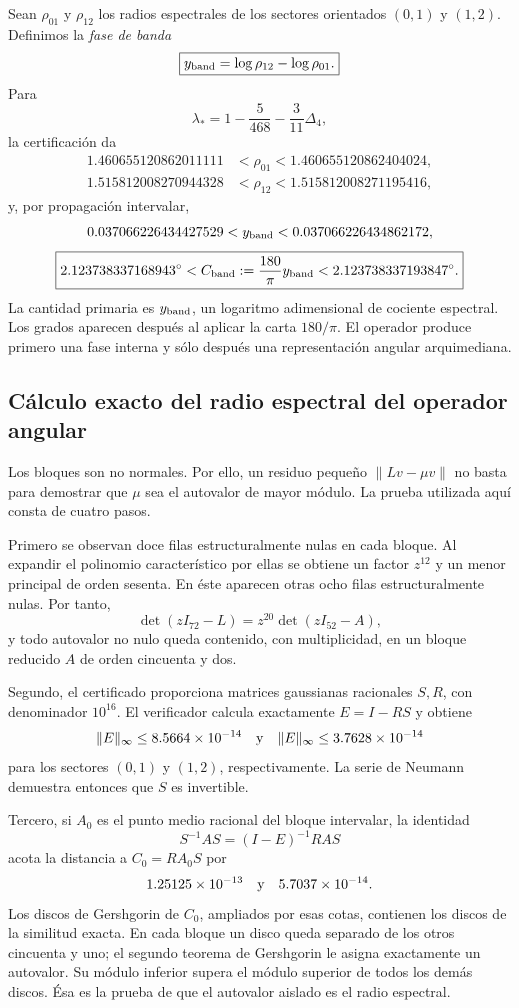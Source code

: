 Sean \(\rho_{01}\) y \(\rho_{12}\) los radios espectrales de los sectores
orientados \((0,1)\) y \((1,2)\). Definimos la \emph{fase de banda}
\[
 \boxed{y_{\rm band}=\log\rho_{12}-\log\rho_{01}.}
\]
Para
\[
 \lambda_*
 =1-\frac5{468}-\frac3{11}\Delta_4,
\]
la certificación da
\[
\begin{aligned}
1.460655120862011111
&<\rho_{01}<1.460655120862404024,\\
1.515812008270944328
&<\rho_{12}<1.515812008271195416,
\end{aligned}
\]
y, por propagación intervalar,
\[
 0.037066226434427529
 <y_{\rm band}<
 0.037066226434862172,
\]
\[
 \boxed{
 2.123738337168943^\circ
 <C_{\rm band}:=\frac{180}{\pi}y_{\rm band}
 <2.123738337193847^\circ.}
\]
La cantidad primaria es \(y_{\rm band}\), un logaritmo adimensional de cociente
espectral. Los grados aparecen después al aplicar la carta
\(180/\pi\). El operador produce primero una fase interna y sólo después
una representación angular arquimediana.

\subsection{Cálculo exacto del radio espectral del operador angular}

Los bloques son no normales. Por ello, un residuo pequeño
\(\|Lv-\mu v\|\) no basta para demostrar que \(\mu\) sea el autovalor de
mayor módulo. La prueba utilizada aquí consta de cuatro pasos.

Primero se observan doce filas estructuralmente nulas en cada bloque. Al
expandir el polinomio característico por ellas se obtiene un factor
\(z^{12}\) y un menor principal de orden sesenta. En éste aparecen otras
ocho filas estructuralmente nulas. Por tanto,
\[
 \det(zI_{72}-L)=z^{20}\det(zI_{52}-A),
\]
y todo autovalor no nulo queda contenido, con multiplicidad, en un bloque
reducido \(A\) de orden cincuenta y dos.

Segundo, el certificado proporciona matrices gaussianas racionales
\(S,R\), con denominador \(10^{16}\). El verificador calcula exactamente
\(E=I-RS\) y obtiene
\[
 \|E\|_\infty\le8.5664\times10^{-14}
 \quad\hbox{y}\quad
 \|E\|_\infty\le3.7628\times10^{-14}
\]
para los sectores \((0,1)\) y \((1,2)\), respectivamente. La serie de
Neumann demuestra entonces que \(S\) es invertible.

Tercero, si \(A_0\) es el punto medio racional del bloque intervalar, la
identidad
\[
 S^{-1}AS=(I-E)^{-1}RAS
\]
acota la distancia a \(C_0=RA_0S\) por
\[
 1.25125\times10^{-13}
 \quad\hbox{y}\quad
 5.7037\times10^{-14}.
\]
Los discos de Gershgorin de \(C_0\), ampliados por esas cotas, contienen
los discos de la similitud exacta. En cada bloque un disco queda separado
de los otros cincuenta y uno; el segundo teorema de Gershgorin le asigna
exactamente un autovalor. Su módulo inferior supera el módulo superior de
todos los demás discos. Ésa es la prueba de que el autovalor aislado es el
radio espectral.

